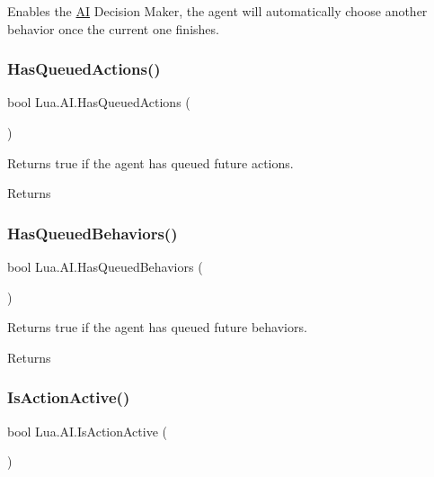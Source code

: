 Enables the \mbox{\hyperlink{class_lua_1_1_a_i}{AI}} Decision Maker, the agent will automatically choose another behavior once the current one finishes. 

\mbox{\label{class_lua_1_1_a_i_a7d2bab4d5dfc0389ab5eeabed6befad7}} 
\subsubsection{\texorpdfstring{HasQueuedActions()}{HasQueuedActions()}}
{\footnotesize\ttfamily bool Lua.\+A\+I.\+Has\+Queued\+Actions (\begin{DoxyParamCaption}{ }\end{DoxyParamCaption})}



Returns true if the agent has queued future actions. 

\begin{DoxyReturn}{Returns}

\end{DoxyReturn}
\mbox{\label{class_lua_1_1_a_i_a51825e643d119b005db422ef6f51d353}} 
\subsubsection{\texorpdfstring{HasQueuedBehaviors()}{HasQueuedBehaviors()}}
{\footnotesize\ttfamily bool Lua.\+A\+I.\+Has\+Queued\+Behaviors (\begin{DoxyParamCaption}{ }\end{DoxyParamCaption})}



Returns true if the agent has queued future behaviors. 

\begin{DoxyReturn}{Returns}

\end{DoxyReturn}
\mbox{\label{class_lua_1_1_a_i_aa05b26304b734cfe6f5a220bb54d9bc7}} 
\subsubsection{\texorpdfstring{IsActionActive()}{IsActionActive()}}
{\footnotesize\ttfamily bool Lua.\+A\+I.\+Is\+Action\+Active (\begin{DoxyParamCaption}{ }\end{DoxyParamCaption})}



